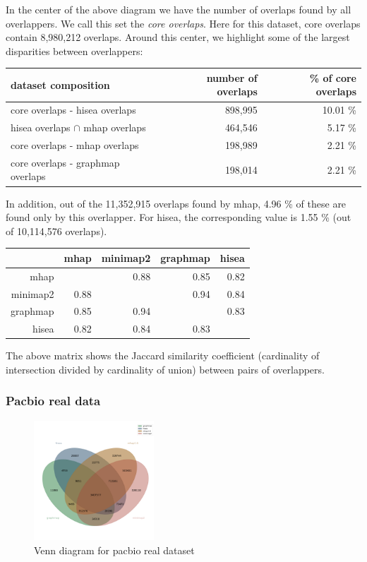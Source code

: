 \documentclass[./main.tex]{subfiles}
\begin{document}
In the center of the above diagram we have the number of overlaps found
by all overlappers. We call this set the \emph{core overlaps}. Here for
this dataset, core overlaps contain 8,980,212 overlaps. Around this
center, we highlight some of the largest disparities between
overlappers:

\begin{table}[ht]
\centering
\begin{tabular}{lrr}
\hline
dataset composition & number of overlaps & \% of core overlaps \\
\hline
core overlaps - hisea overlaps & 898,995 & 10.01 \% \\
hisea overlaps \(\cap\) mhap overlaps & 464,546 & 5.17 \% \\
core overlaps - mhap overlaps & 198,989 & 2.21 \% \\
core overlaps - graphmap overlaps & 198,014 & 2.21 \% \\
\hline
\end{tabular}
\end{table}

In addition, out of the 11,352,915 overlaps found by mhap, 4.96 \% of
these are found only by this overlapper. For hisea, the corresponding
value is 1.55 \% (out of 10,114,576 overlaps).

\begin{table}[ht]
\centering
\begin{tabular}{rrrrr}
\hline
& mhap & minimap2 & graphmap & hisea \\
\hline
mhap & & 0.88 & 0.85 & 0.82 \\
minimap2 & 0.88 & & 0.94 & 0.84 \\
graphmap & 0.85 & 0.94 & & 0.83 \\
hisea & 0.82 & 0.84 & 0.83 & \\
\hline
\end{tabular}
\end{table}
The above matrix shows the Jaccard similarity coefficient (cardinality
of intersection divided by cardinality of union) between pairs of
overlappers.

\subsubsection{Pacbio real data}\label{preassembly:ovl:pacbio-real-data}

\begin{figure}[ht]
\centering
\includegraphics[width=0.4\textwidth]{paper/blog_post/pacbio_venn.png}
\caption{Venn diagram for pacbio real dataset}
\end{figure}
\end{document}
